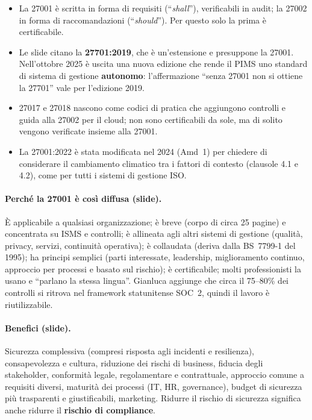\begin{integrazione}
\begin{itemize}
  \item La 27001 è scritta in forma di requisiti (``\emph{shall}''), verificabili in audit; la 27002 in forma
    di raccomandazioni (``\emph{should}''). Per questo solo la prima è certificabile.
  \item Le slide citano la \textbf{27701:2019}, che è un'estensione e presuppone la 27001. Nell'ottobre 2025 è
    uscita una nuova edizione che rende il PIMS uno standard di sistema di gestione \textbf{autonomo}:
    l'affermazione ``senza 27001 non si ottiene la 27701'' vale per l'edizione 2019.
  \item 27017 e 27018 nascono come codici di pratica che aggiungono controlli e guida alla 27002 per il
    cloud; non sono certificabili da sole, ma di solito vengono verificate insieme alla 27001.
  \item La 27001:2022 è stata modificata nel 2024 (Amd~1) per chiedere di considerare il cambiamento
    climatico tra i fattori di contesto (clausole 4.1 e 4.2), come per tutti i sistemi di gestione ISO.
\end{itemize}
\end{integrazione}

\paragraph{Perché la 27001 è così diffusa (slide).} È applicabile a qualsiasi organizzazione; è breve (corpo
di circa 25 pagine) e concentrata su ISMS e controlli; è allineata agli altri sistemi di gestione (qualità,
privacy, servizi, continuità operativa); è collaudata (deriva dalla BS~7799-1 del 1995); ha principi semplici
(parti interessate, leadership, miglioramento continuo, approccio per processi e basato sul rischio); è
certificabile; molti professionisti la usano e ``parlano la stessa lingua''. Gianluca aggiunge che circa il
75--80\% dei controlli si ritrova nel framework statunitense SOC~2, quindi il lavoro è riutilizzabile.

\paragraph{Benefici (slide).} Sicurezza complessiva (compresi risposta agli incidenti e resilienza),
consapevolezza e cultura, riduzione dei rischi di business, fiducia degli stakeholder, conformità legale,
regolamentare e contrattuale, approccio comune a requisiti diversi, maturità dei processi (IT, HR,
governance), budget di sicurezza più trasparenti e giustificabili, marketing. Ridurre il rischio di
sicurezza significa anche ridurre il \textbf{rischio di compliance}.

